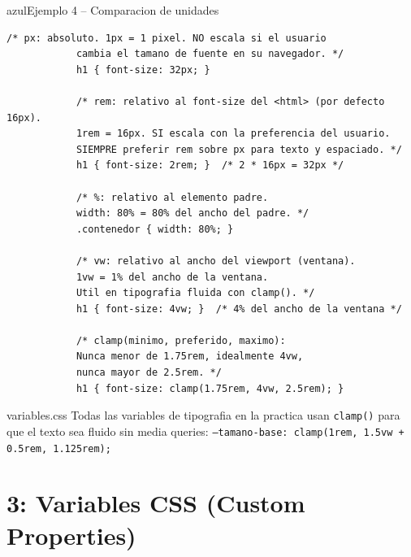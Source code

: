 \documentclass[11pt,a4paper]{article}
\begin{document}
	\begin{cajacodigo}{azul}{Ejemplo 4 -- Comparacion de unidades}
		\begin{lstlisting}[style=codecss]
			/* px: absoluto. 1px = 1 pixel. NO escala si el usuario
			cambia el tamano de fuente en su navegador. */
			h1 { font-size: 32px; }
			
			/* rem: relativo al font-size del <html> (por defecto 16px).
			1rem = 16px. SI escala con la preferencia del usuario.
			SIEMPRE preferir rem sobre px para texto y espaciado. */
			h1 { font-size: 2rem; }  /* 2 * 16px = 32px */
			
			/* %: relativo al elemento padre.
			width: 80% = 80% del ancho del padre. */
			.contenedor { width: 80%; }
			
			/* vw: relativo al ancho del viewport (ventana).
			1vw = 1% del ancho de la ventana.
			Util en tipografia fluida con clamp(). */
			h1 { font-size: 4vw; }  /* 4% del ancho de la ventana */
			
			/* clamp(minimo, preferido, maximo):
			Nunca menor de 1.75rem, idealmente 4vw,
			nunca mayor de 2.5rem. */
			h1 { font-size: clamp(1.75rem, 4vw, 2.5rem); }
		\end{lstlisting}
	\end{cajacodigo}
	
	\begin{cajapractica}{variables.css}
		Todas las variables de tipografia en la practica usan \texttt{clamp()} para que el texto sea fluido sin media queries: \texttt{--tamano-base: clamp(1rem, 1.5vw + 0.5rem, 1.125rem);}
	\end{cajapractica}
	
	\section{3: Variables CSS (Custom Properties)}
	
\end{document}
